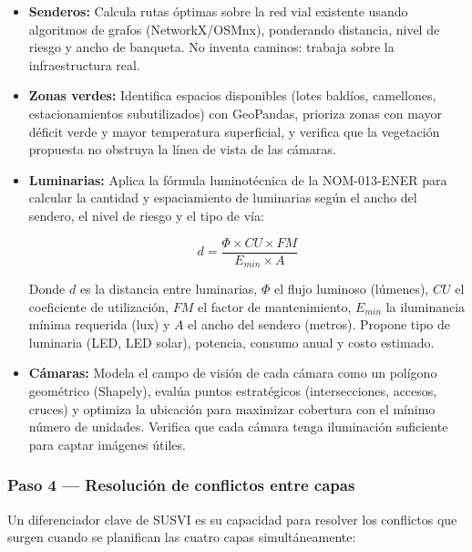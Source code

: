 \documentclass[12pt,a4paper]{article}
\begin{document}
\begin{itemize}[leftmargin=1.5cm]
    \item \textbf{Senderos:} Calcula rutas óptimas sobre la red vial existente usando algoritmos de grafos (NetworkX/OSMnx), ponderando distancia, nivel de riesgo y ancho de banqueta. No inventa caminos: trabaja sobre la infraestructura real.
    
    \item \textbf{Zonas verdes:} Identifica espacios disponibles (lotes baldíos, camellones, estacionamientos subutilizados) con GeoPandas, prioriza zonas con mayor déficit verde y mayor temperatura superficial, y verifica que la vegetación propuesta no obstruya la línea de vista de las cámaras.
    
    \item \textbf{Luminarias:} Aplica la fórmula luminotécnica de la NOM-013-ENER para calcular la cantidad y espaciamiento de luminarias según el ancho del sendero, el nivel de riesgo y el tipo de vía:
    
    \begin{equation}
        d = \frac{\Phi \times CU \times FM}{E_{min} \times A}
    \end{equation}
    
    Donde $d$ es la distancia entre luminarias, $\Phi$ el flujo luminoso (lúmenes), $CU$ el coeficiente de utilización, $FM$ el factor de mantenimiento, $E_{min}$ la iluminancia mínima requerida (lux) y $A$ el ancho del sendero (metros). Propone tipo de luminaria (LED, LED solar), potencia, consumo anual y costo estimado.
    
    \item \textbf{Cámaras:} Modela el campo de visión de cada cámara como un polígono geométrico (Shapely), evalúa puntos estratégicos (intersecciones, accesos, cruces) y optimiza la ubicación para maximizar cobertura con el mínimo número de unidades. Verifica que cada cámara tenga iluminación suficiente para captar imágenes útiles.
\end{itemize}

\subsubsection{Paso 4 — Resolución de conflictos entre capas}

Un diferenciador clave de SUSVI es su capacidad para resolver los conflictos que surgen cuando se planifican las cuatro capas simultáneamente:
\end{document}
